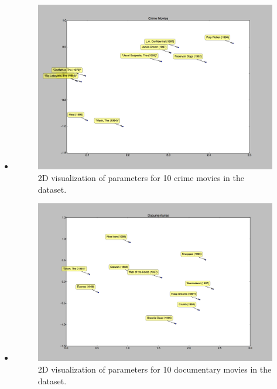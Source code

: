 \begin{itemize}
    \pagebreak
    \item {}

    \begin{figure}[H]
    \centering
    \includegraphics[width=\textwidth]{crime_2d_vis}
    \caption{2D visualization of parameters for 10 crime movies in the dataset.}
    \end{figure}


    \pagebreak
    \item {}

    \begin{figure}[H]
    \centering
    \includegraphics[width=\textwidth]{documentaries_2d_vis}
    \caption{2D visualization of parameters for 10 documentary movies in the dataset.}
    \end{figure}



\end{itemize}
